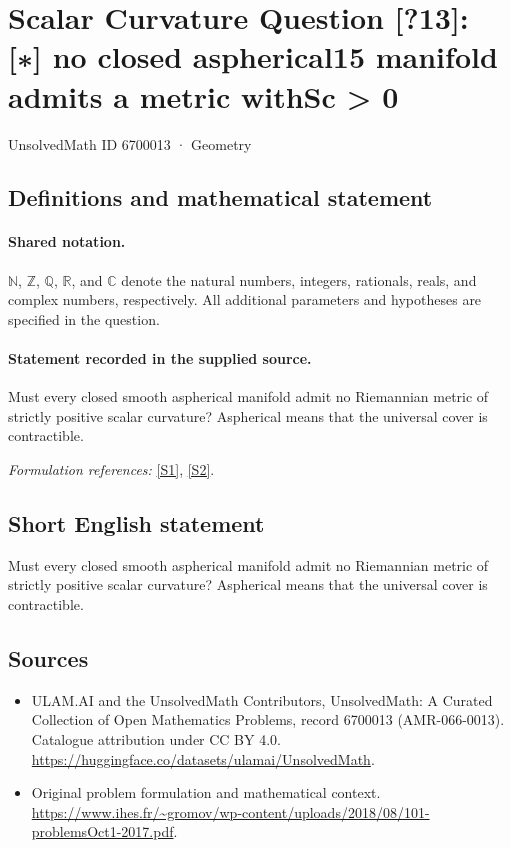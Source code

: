 \documentclass[11pt]{article}
\newcommand{\sref}[2]{\hyperlink{source:#1:#2}{[S#2]}}
\begin{document}
\setcounter{section}{6700012}
\section{Scalar Curvature Question [?13]: [∗] no closed aspherical15 manifold admits a metric withSc > 0}\label{6700013}
{\small UnsolvedMath ID 6700013 · Geometry}
\subsection{Definitions and mathematical statement}

\paragraph{Shared notation.}$\mathbb N$, $\mathbb Z$, $\mathbb Q$, $\mathbb R$, and $\mathbb C$ denote the natural numbers, integers, rationals, reals, and complex numbers, respectively. All additional parameters and hypotheses are specified in the question.


\paragraph{Statement recorded in the supplied source.}
Must every closed smooth aspherical manifold admit no Riemannian metric of strictly positive scalar curvature? Aspherical means that the universal cover is contractible.
\par\smallskip\textit{Formulation references:} \sref{6700013}{1}, \sref{6700013}{2}.
\subsection{Short English statement}
Must every closed smooth aspherical manifold admit no Riemannian metric of strictly positive scalar curvature? Aspherical means that the universal cover is contractible.
\subsection{Sources}
\begin{itemize}
\item[\hypertarget{source:6700013:1}{S1}] ULAM.AI and the UnsolvedMath Contributors, UnsolvedMath: A Curated Collection of Open Mathematics Problems, record 6700013 (AMR-066-0013). Catalogue attribution under CC BY 4.0.
\url{https://huggingface.co/datasets/ulamai/UnsolvedMath}.
\item[\hypertarget{source:6700013:2}{S2}] Original problem formulation and mathematical context.
\url{https://www.ihes.fr/~gromov/wp-content/uploads/2018/08/101-problemsOct1-2017.pdf}.
\end{itemize}
\label{end:6700013}
\end{document}
